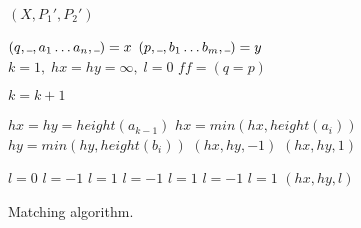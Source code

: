 \documentclass[AMA,STIX1COL]{WileyNJD-v2}
\newcommand{\Xund}{\rule{.4em}{.4pt}}
\begin{document}
\begin{figure*}
\begin{multicols}{2}
\begin{algorithm}[H]
{        \BlankLine
        \Return $(X, P_1', P_2')$ \;
    }
    \end{algorithm}

    \columnbreak


    \newcommand \ff {f\!\!f}

    \begin{algorithm}[H] \DontPrintSemicolon {}
     {
        $(q, \Xund, a_1 \dots a_n, \Xund) = x$ \;
        $(p, \Xund, b_1 \dots b_m, \Xund) = y$ \;
        $k = 1, \; hx = hy = \infty, \; l = 0$ \;
        $\ff = (q = p)$ 

        \BlankLine
        \If { $\ff$ } {
             {
              $k = k + 1$
            }
        }

        \BlankLine
        \lIf { $\ff$ } {
            $hx = hy = height (a_{k-1})$
        } 
         {
            $hx = min (hx, height (a_i))$
        }
         {
            $hy = min (hy, height (b_i))$
        }
         {\Return $(hx, hy, -1)$}
         {\Return $(hx, hy, 1)$}

        \BlankLine
        \If { $\ff$ } {
             { $l = 0$ }
             { $l = -1$ }
             { $l = 1$ }
             { $l = -1$ }
             { $l = 1$ }
             { $l = -1$ }
             { $l = 1$ }
        } 
        \Return $(hx, hy, l)$
    }
    \end{algorithm}

\end{multicols}
\begin{center}
\caption{Matching algorithm.}
\end{center}
\end{figure*}


\clearpage
\pagebreak
\end{document}

